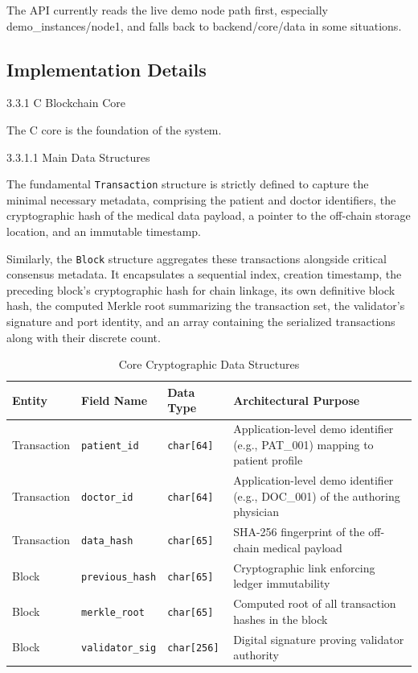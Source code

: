 \documentclass[12pt]{article}
\begin{document}
The API currently reads the live demo node path first, especially demo\_instances/node1, and falls back to backend/core/data in some situations.

\subsection{Implementation Details}

3.3.1 C Blockchain Core

The C core is the foundation of the system.

3.3.1.1 Main Data Structures

The fundamental \texttt{Transaction} structure is strictly defined to capture the minimal necessary metadata, comprising the patient and doctor identifiers, the cryptographic hash of the medical data payload, a pointer to the off-chain storage location, and an immutable timestamp.

Similarly, the \texttt{Block} structure aggregates these transactions alongside critical consensus metadata. It encapsulates a sequential index, creation timestamp, the preceding block's cryptographic hash for chain linkage, its own definitive block hash, the computed Merkle root summarizing the transaction set, the validator's signature and port identity, and an array containing the serialized transactions along with their discrete count.

\begin{table}[htbp]
\centering
\small
\renewcommand{\arraystretch}{1.15}
\caption{Core Cryptographic Data Structures}
\label{tab:core-structures}
\vspace{2mm}
\begin{tabularx}{\textwidth}{|l|l|l|Y|}
\hline
\textbf{Entity} & \textbf{Field Name} & \textbf{Data Type} & \textbf{Architectural Purpose} \\ \hline
Transaction & \texttt{patient\_id} & \texttt{char[64]} & Application-level demo identifier (e.g., PAT\_001) mapping to patient profile \\ \hline
Transaction & \texttt{doctor\_id} & \texttt{char[64]} & Application-level demo identifier (e.g., DOC\_001) of the authoring physician \\ \hline
Transaction & \texttt{data\_hash} & \texttt{char[65]} & SHA-256 fingerprint of the off-chain medical payload \\ \hline
Block & \texttt{previous\_hash} & \texttt{char[65]} & Cryptographic link enforcing ledger immutability \\ \hline
Block & \texttt{merkle\_root} & \texttt{char[65]} & Computed root of all transaction hashes in the block \\ \hline
Block & \texttt{validator\_sig} & \texttt{char[256]} & Digital signature proving validator authority \\ \hline
\end{tabularx}
\end{table}
\end{document}
